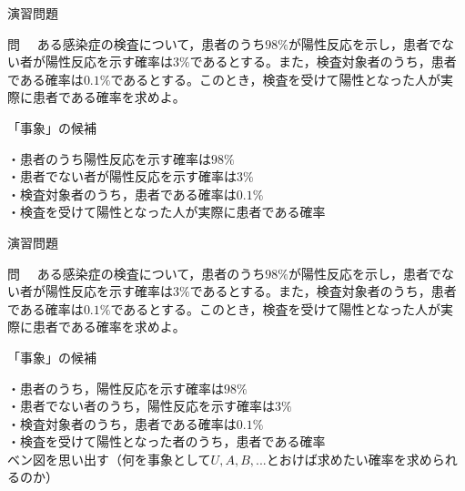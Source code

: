 \documentclass[aspectratio=169, dvipdfmx, 11pt]{beamer}
\begin{document}
\begin{frame}{演習問題}

\begin{block}{問}
　ある感染症の検査について，患者のうち$98\%$が陽性反応を示し，患者でない者が陽性反応を示す確率は$3\%$であるとする。また，検査対象者のうち，患者である確率は$0.1\%$であるとする。このとき，検査を受けて陽性となった人が実際に患者である確率を求めよ。
\end{block}

\begin{alertblock}{「事象」の候補}
\end{alertblock}

\begin{tcolorbox}[colframe=blue,
    colback=blue!10!white,
    colbacktitle=blue!40!white,
    coltitle=black, fonttitle=\bfseries,
    title=hint\ 問題文中にある確率]
・患者のうち陽性反応を示す確率は$98\%$\\
・患者でない者が陽性反応を示す確率は$3\%$\\
・検査対象者のうち，患者である確率は$0.1\%$\\
・検査を受けて陽性となった人が実際に患者である確率
\end{tcolorbox}

\end{frame}


\begin{frame}{演習問題}

\begin{block}{問}
　ある感染症の検査について，患者のうち$98\%$が陽性反応を示し，患者でない者が陽性反応を示す確率は$3\%$であるとする。また，検査対象者のうち，患者である確率は$0.1\%$であるとする。このとき，検査を受けて陽性となった人が実際に患者である確率を求めよ。
\end{block}

\begin{alertblock}{「事象」の候補}
\end{alertblock}

\begin{tcolorbox}[colframe=blue,
    colback=blue!10!white,
    colbacktitle=blue!40!white,
    coltitle=black, fonttitle=\bfseries,
    title=hint\ 問題文中にある確率]
・患者のうち，陽性反応を示す確率は$98\%$\\
・患者でない者のうち，陽性反応を示す確率は$3\%$\\
・検査対象者のうち，患者である確率は$0.1\%$\\
・検査を受けて陽性となった者のうち，患者である確率
\\
ベン図を思い出す（何を事象として$U,A,B,...$とおけば求めたい確率を求められるのか）
\end{tcolorbox}

\end{frame}
\end{document}
